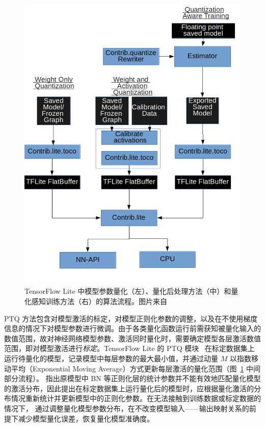 \begin{figure}[htb]
  \centering
  \includegraphics[width=0.75\columnwidth]{Img/Background/qat_ptq.png}
  \caption{TensorFlow Lite 中模型参数量化（左）、量化后处理方法（中）和量化感知训练方法（右）的算法流程。图片来自~\citet{krishnamoorthi2018quantizing}}
  \label{img::background::qat_ptq}
\end{figure}

PTQ 方法包含对模型激活的标定，对模型正则化参数的调整，以及在不使用梯度信息的情况下对模型参数进行微调。由于各类量化函数运行前需获知被量化输入的数值范围，故对神经网络模型参数、激活同时量化时，需要确定模型各层激活数值范围，即对模型激活进行\emph{标定}。TensorFlow Lite 的 PTQ 模块~\citep{abadi2016tensorflow, krishnamoorthi2018quantizing} 在标定数据集上运行待量化的模型，记录模型中每层参数的最大最小值，并通过动量 $M$ 以指数移动平均（Exponential Moving Average）方式更新每层激活的量化范围（图~\ref{img::background::qat_ptq} 中间部分流程）。\citet{he2018learning, peters2018probabilistic} 指出原模型中 BN 等正则化层的统计参数并不能有效地匹配量化模型的激活分布，因此提出在标定数据集上运行量化后的模型时，应根据量化激活的分布情况重新统计并更新模型中的正则化参数。在无法接触到训练数据或标定数据的情况下，\citet{nagel2019data, meller2019same} 通过调整量化模型参数分布，在不改变模型输入——输出映射关系的前提下减少模型量化误差，恢复量化模型准确度。

